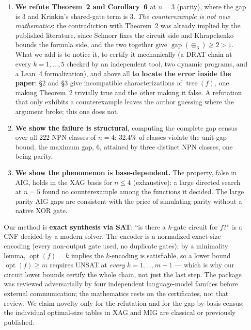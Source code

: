 \documentclass[11pt]{article}
\DeclareMathOperator{\opt}{opt}
\DeclareMathOperator{\tree}{tree}
\DeclareMathOperator{\gapop}{gap}
\theoremstyle{plain}
\begin{document}
\begin{enumerate}
  \item \textbf{We refute Theorem~2 and Corollary~6} at $n = 3$ (parity), where the gap is 3 and
  Krinkin's shared-gate term is 3. \emph{The counterexample is not new mathematics}: the
  contradiction with Theorem~2 was already implied by the published literature, since Schnorr
  fixes the circuit side and Khrapchenko bounds the formula side, and the two together give
  $\gapop(\oplus_3) \ge 2 > 1$. What we add is to
  notice it, to certify it mechanically (a DRAT chain at every $k = 1,\dots,5$ checked by an
  independent tool, two dynamic programs, and a Lean~4 formalization), and above all \textbf{to
  locate the error inside the paper}: \S2 and \S3 give incompatible characterizations of
  $\tree(f)$, one making Theorem~2 trivially true and the other making it false. A refutation that
  only exhibits a counterexample leaves the author guessing where the argument broke; this one does
  not.

  \item \textbf{We show the failure is structural}, computing the complete gap census over all 222
  NPN classes of $n = 4$: 32.4\% of classes violate the unit-gap bound, the maximum gap, 6, attained by
  three distinct NPN classes, one being parity.

  \item \textbf{We show the phenomenon is base-dependent.} The property, false in AIG, holds in the
  XAG basis for $n \le 4$ (exhaustive); a large directed search at $n = 5$ found no counterexample
  among the functions it decided. The large parity
  AIG gaps are consistent with the price of simulating parity without a native XOR gate.
\end{enumerate}

Our method is \textbf{exact synthesis via SAT}: ``is there a $k$-gate circuit for $f$?'' is a CNF
decided by a modern solver. The encoder is a normalized exact-size encoding (every non-output gate
used, no duplicate gates); by a minimality lemma, $\opt(f) = k$ implies the $k$-encoding is
satisfiable, so a lower bound $\opt(f) \ge m$ requires UNSAT at \emph{every} $k = 1,\dots,m-1$ ---
which is why our circuit lower bounds certify the whole chain, not just the last step. The package
was reviewed adversarially by four independent language-model families before external
communication; the mathematics rests on the certificates, not that review. We claim novelty only for
the refutation and for the gap-by-basis census; the individual optimal-size tables in XAG and MIG
are classical or previously published.
\end{document}
